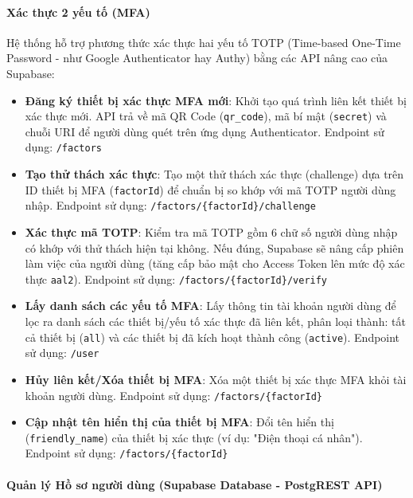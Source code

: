 \paragraph{Xác thực 2 yếu tố (MFA)}

Hệ thống hỗ trợ phương thức
xác thực hai yếu tố TOTP (Time-based One-Time Password - như Google Authenticator hay Authy)
bằng các API nâng cao của Supabase:

\begin{itemize}
\item \textbf{Đăng ký thiết bị xác thực MFA mới}:
Khởi tạo quá trình liên kết thiết bị xác thực mới. API trả về mã QR Code (\texttt{qr\_code}), mã bí mật (\texttt{secret}) và chuỗi URI để người dùng quét trên ứng dụng Authenticator.
Endpoint sử dụng: \texttt{/factors}

\item \textbf{Tạo thử thách xác thực}:
Tạo một thử thách xác thực (challenge) dựa trên ID thiết bị MFA (\texttt{factorId}) để chuẩn bị so khớp với mã TOTP người dùng nhập.
Endpoint sử dụng: \texttt{/factors/\{factorId\}/challenge}

\item \textbf{Xác thực mã TOTP}:
Kiểm tra mã TOTP gồm 6 chữ số người dùng nhập có khớp với thử thách hiện tại không. Nếu đúng, Supabase sẽ nâng cấp phiên làm việc của người dùng (tăng cấp bảo mật cho Access Token lên mức độ xác thực \texttt{aal2}).
Endpoint sử dụng: \texttt{/factors/\{factorId\}/verify}

\item \textbf{Lấy danh sách các yếu tố MFA}:
Lấy thông tin tài khoản người dùng để lọc ra danh sách các thiết bị/yếu tố xác thực đã liên kết, phân loại thành: tất cả thiết bị (\texttt{all}) và các thiết bị đã kích hoạt thành công (\texttt{active}).
Endpoint sử dụng: \texttt{/user}

\item \textbf{Hủy liên kết/Xóa thiết bị MFA}:
Xóa một thiết bị xác thực MFA khỏi tài khoản người dùng.
Endpoint sử dụng: \texttt{/factors/\{factorId\}}

\item \textbf{Cập nhật tên hiển thị của thiết bị MFA}:
Đổi tên hiển thị (\texttt{friendly\_name}) của thiết bị xác thực (ví dụ: "Điện thoại cá nhân").
Endpoint sử dụng: \texttt{/factors/\{factorId\}}

\end{itemize}

\paragraph{Quản lý Hồ sơ người dùng (Supabase Database - PostgREST API)}

